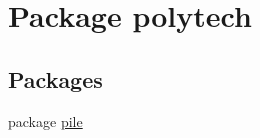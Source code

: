 \hypertarget{namespacepolytech}{}\section{Package polytech}
\label{namespacepolytech}
\subsection*{Packages}
\begin{DoxyCompactItemize}
\item 
package \hyperlink{namespacepolytech_1_1pile}{pile}
\end{DoxyCompactItemize}
